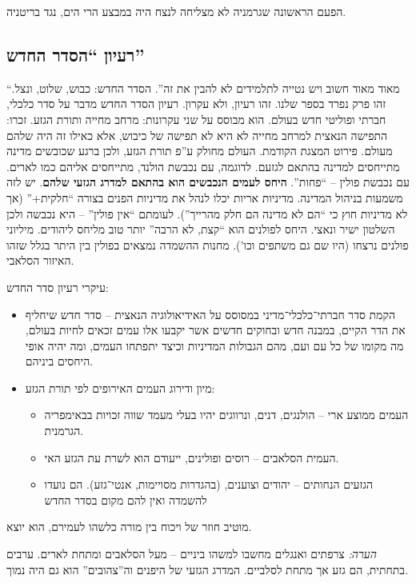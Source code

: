\documentclass[a4paper]{book}
\begin{document}
	הפעם הראשונה שגרמניה לא מצליחה לנצח היה במבצע הרי הים, נגד בריטניה. 
	
	\subsection{רעיון ``הסדר החדש''}
	``מאוד מאוד חשוב ויש נטייה לתלמידים לא להבין את זה''. הסדר החדש: כבוש, שלוט, ונצל. זהו פרק נפרד בספר שלנו. זהו רעיון, ולא עקרון. רעיון הסדר החדש מדבר על סדר כלכלי, חברתי ופוליטי חדש בעולם. הוא מבוסס על שני עקרונות: מרחב מחייה ותורת הגזע. זכרו: התפישה הנאצית למרחב מחייה לא היא לא תפישה של כיבוש, אלא כאילו זה היה שלהם מעולם. פירוט המצגת הקודמת. העולם מחולק ע''פ תורת הגזע, ולכן ברגע שכובשים מדינה מתייחסים למדינה בהתאם לגזעם. לדוגמה, עם נכבשת הולנד, מתייחסים אליהם כמו לארים. עם נכבשת פולין – ``פחות''. \textbf{היחס לעמים הנכבשים הוא בהתאם למדרג הגזעי שלהם}. יש לזה משמעות בניהול המדינה. מדיניות אריות יכלו לנהל את מדיניות הפנים בצורה ``חלקית+'' (אך לא מדיניות חוץ כי ``הם לא מדינה הם חלק מהרייך''). לעומתם ``אין פולין'' – היא נכבשה ולכן השלטון ישיר ונאצי. היחס לפולנים הוא ``קצת, לא הרבה'' יותר טוב מליחס ליהודים. מיליוני פולנים נרצחו (היו שם גם משתפים וכו'). מחנות ההשמדה נמצאים בפולין בין היתר בגלל שזהו האיזור הסלאבי. 
	
	עיקרי רעיון סדר החדש: 
	\begin{itemize}
		\item הקמת סדר חברתי־כלכלי־מדיני במסוסס על האידיאולוגיה הנאצית – סדר חדש שיחליף את הדר הקיים, במבנה חדש ובחוקים חדשים אשר יקבעו אלו עמים זכאים לחיות בעולם, מה מקומו של כל עם ועם, מהם הגבולות המדיניות וכיצד יתפתחו העמים, ומה יהיה אופי היחסים ביניהם. 
		\item מיון ודירוג העמים האירופים לפי תורת הגזע: 
		\begin{itemize}
			\item העמים ממוצע ארי – הולנגים, דנים, ונרווגים יהיו בעלי מעמד שווה זכויות בבאימפריה הגרמנית. 
			\item העמית הסלאבים – רוסים ופולינים, ייעודם הוא לשרת עת הגזע האי. 
			\item הגזעים הנחותים – יהודים וצוענים, (בהגדרות מסויימות, אנטי־גזע). הם נועדו להשמדה ואין להם מקום בסדר החדש
		\end{itemize}
	\end{itemize}
	מוטיב חוזר של ויכוח בין מורה כלשהו לעמירם, הוא יוצא. 
	
	\textit{הערה: }צרפתים ואנגלים מחשבו למשהו ביניים – מעל הסלאבים ומתחת לארים. ערבים בתחתית, הם גזע אך מתחת לסלביים. המדרג הגזעי של היפנים וה''צהובים'' הוא גם היה נמוך. 
	
\end{document}
